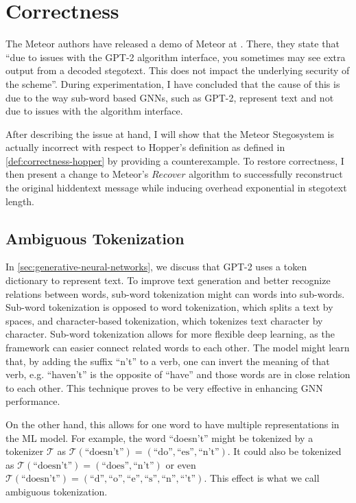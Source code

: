 \chapter{Correctness}
\label{chap:correctness}

The Meteor authors have released a demo of Meteor at \cite{MeteorDemo2021}. There, they state that ``due to issues with the GPT-2 algorithm interface, you sometimes may see extra output from a decoded stegotext. This does not impact the underlying security of the scheme''.
During experimentation, I have concluded that the cause of this is due to the way sub-word based GNNs, such as GPT-2, represent text and not due to issues with the algorithm interface.

After describing the issue at hand, I will show that the Meteor Stegosystem is actually incorrect with respect to Hopper's definition as defined in \autoref{def:correctness-hopper} by providing a counterexample.
To restore correctness, I then present a change to Meteor's $Recover$ algorithm to successfully reconstruct the original hiddentext message while inducing overhead exponential in stegotext length.

\section{Ambiguous Tokenization}

In \autoref{sec:generative-neural-networks}, we discuss that GPT-2 uses a token dictionary to represent text.
To improve text generation and better recognize relations between words, sub-word tokenization might can words into sub-words.
Sub-word tokenization is opposed to word tokenization, which splits a text by spaces, and character-based tokenization, which tokenizes text character by character.
Sub-word tokenization allows for more flexible deep learning, as the framework can easier connect related words to each other. 
The model might learn that, by adding the suffix ``n't'' to a verb, one can invert the meaning of that verb, e.g. ``haven't'' is the opposite of ``have'' and those words are in close relation to each other.
This technique proves to be very effective in enhancing GNN performance.

On the other hand, this allows for one word to have multiple representations in the ML model.
For example, the word ``doesn't'' might be tokenized by a tokenizer $\mathcal{T}$ as $\mathcal{T}(\textrm{``doesn't''}) = ( \textrm{``do''}, \textrm{``es''}, \textrm{``n't''} )$. It could also be tokenized as $\mathcal{T}(\textrm{``doesn't''}) = ( \textrm{``does''}, \textrm{``n't''} )$ or even $\mathcal{T}(\textrm{``doesn't''}) = ( \textrm{``d''}, \textrm{``o''}, \textrm{``e''}, \textrm{``s''}, \textrm{``n''}, \textrm{``'t''})$.
This effect is what we call ambiguous tokenization.

